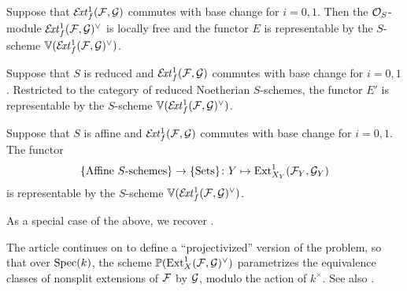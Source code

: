 \begin{proposition}
	Suppose that $\mathcal{E}\!\mathit{xt}^1_f(\mathcal{F},\mathcal{G})$ commutes with base change for $i=0,1$. Then the $\mathcal{O}_S$-module $\mathcal{E}\!\mathit{xt}^1_f(\mathcal{F},\mathcal{G})^\vee$ is locally free and the functor $E$ is representable by the $S$-scheme $\mathbb{V}(\mathcal{E}\!\mathit{xt}^1_f(\mathcal{F},\mathcal{G})^\vee)$.
\end{proposition}

\begin{corollary}
	Suppose that $S$ is reduced and $\mathcal{E}\!\mathit{xt}^1_f(\mathcal{F},\mathcal{G})$ commutes with base change for $i=0,1$. Restricted to the category of reduced Noetherian $S$-schemes, the functor $E'$ is representable by the $S$-scheme $\mathbb{V}(\mathcal{E}\!\mathit{xt}^1_f(\mathcal{F},\mathcal{G})^\vee)$.
\end{corollary}

\begin{corollary}
	Suppose that $S$ is affine and $\mathcal{E}\!\mathit{xt}^1_f(\mathcal{F},\mathcal{G})$ commutes with base change for $i=0,1$. The functor
	\[
		\{\text{Affine $S$-schemes}\} \to \{\text{Sets}\}
		\colon
		Y \mapsto \operatorname{Ext}^1_{X_Y}(\mathcal{F}_Y,\mathcal{G}_Y)
	\]
	is representable by the $S$-scheme $\mathbb{V}(\mathcal{E}\!\mathit{xt}^1_f(\mathcal{F},\mathcal{G})^\vee)$.
\end{corollary}

\begin{remark}
As a special case of the above, we recover .
\end{remark}

\begin{remark}
	The article \cite{lange-universal-extensions} continues on to define a ``projectivized'' version of the problem, so that over $\operatorname{Spec}(k)$, the scheme $\mathbb{P}(\operatorname{Ext}^1_X(\mathcal{F},\mathcal{G})^\vee)$ parametrizes the equivalence classes of nonsplit extensions of $\mathcal{F}$ by $\mathcal{G}$, modulo the action of $k^{\times}$. See also \cite[Example 2.1.12]{huybrechts-lehn-sheaves}.
\end{remark}

